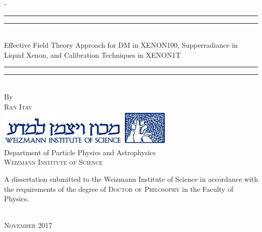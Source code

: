%
%
% 
%
%
\begin{titlingpage}
\begin{SingleSpace}
\calccentering{\unitlength} 
\begin{adjustwidth*}{\unitlength}{-\unitlength}
\vspace*{13mm}
\begin{center}
\rule[0.5ex]{\linewidth}{2pt}\vspace*{-\baselineskip}\vspace*{3.2pt}
\rule[0.5ex]{\linewidth}{1pt}\\[\baselineskip]
{\HUGE Effective Field Theory Approach for DM in XENON100, Supperradiance in Liquid Xenon, and Calibration Techniques in XENON1T }\\[4mm]
\rule[0.5ex]{\linewidth}{1pt}\vspace*{-\baselineskip}\vspace{3.2pt}
\rule[0.5ex]{\linewidth}{2pt}\\
\vspace{6.5mm}
{\large By}\\
\vspace{6.5mm}
{\large\textsc{Ran Itay}}\\
\vspace{11mm}
\includegraphics[scale=1]{logos/wislogo.png}\\
\vspace{6mm}
{\large Department of Particle Physics and Astrophysics\\
\textsc{Weizmann Institute of Science}}\\
\vspace{41mm}
\begin{minipage}{10cm}
A dissertation submitted to the Weizmann Institute of Science in accordance with the requirements of the degree of \textsc{Doctor of Philosophy} in the Faculty of Physics.
\end{minipage}\\
\vspace{9mm}
{\large\textsc{November 2017}}
\vspace{12mm}
\end{center}


\end{adjustwidth*}
\end{SingleSpace}
\end{titlingpage}
